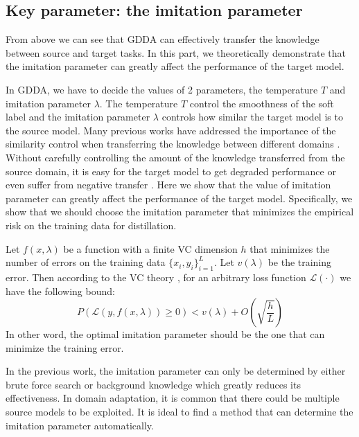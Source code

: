 \subsection{Key parameter: the imitation parameter}\label{sec:key}
From above we can see that GDDA can effectively transfer the knowledge between source and target tasks. In this part, we theoretically demonstrate that the imitation parameter can greatly affect the performance of the target model.

In GDDA, we have to decide the values of 2 parameters, the temperature $T$ and imitation parameter $\lambda$. The temperature $T$ control the smoothness of the soft label and the imitation parameter $\lambda$ controls how similar the target model is to the source model. Many previous works have addressed the importance of the similarity control when transferring the knowledge between different domains \cite{duan2012learning,duan2012visual}. Without carefully controlling the amount of the knowledge transferred from the source domain, it is easy for the target model to get degraded performance or even suffer from negative transfer \cite{pan2010survey}.
Here we show that the value of imitation parameter can greatly affect the performance of the target model. Specifically, we show that we should choose the imitation parameter that minimizes the empirical risk on the training data for distillation.

Let $f(x,\lambda)$ be a function with a finite VC dimension $h$ that minimizes the number of errors on the training data $\{x_i,y_i\}_{i=1}^L$. Let $v(\lambda)$ be the training error. Then according to the VC theory \cite{vapnik1999overview}, for an arbitrary loss function $\mathcal{L}(\cdot)$ we have the following bound:
\begin{equation}\label{eq:lambda_constraint}
P\left(\mathcal{L}\left(y,f(x,\lambda)\right)\geq 0\right) < v(\lambda)+O\left(\sqrt{\frac{h}{L}}\right)
\end{equation}
In other word, the optimal imitation parameter should be the one that can minimize the training error.  

In the previous work, the imitation parameter can only be determined by either brute force search \cite{lopez2015unifying} or background knowledge \cite{Tzeng_2015_ICCV} which greatly reduces its effectiveness. In domain adaptation, it is common that there could be multiple source models to be exploited. It is ideal to find a method that can determine the imitation parameter automatically.
